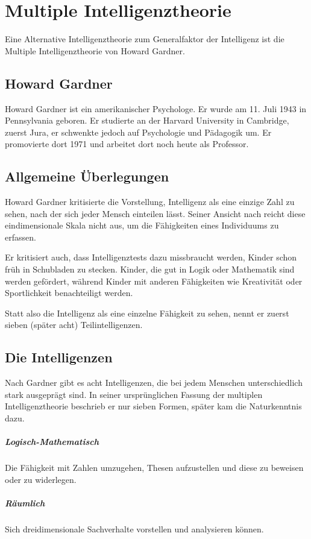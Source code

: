 \chapter{Multiple Intelligenztheorie}
Eine Alternative Intelligenztheorie zum Generalfaktor der Intelligenz ist die Multiple Intelligenztheorie von Howard Gardner.

\section{Howard Gardner}
Howard Gardner ist ein amerikanischer Psychologe. Er wurde am 11. Juli 1943 in Pennsylvania geboren. Er studierte an der Harvard University in Cambridge, zuerst Jura, er schwenkte jedoch auf Psychologie und Pädagogik um. Er promovierte dort 1971 und arbeitet dort noch heute als Professor.

\section{Allgemeine Überlegungen}
Howard Gardner kritisierte die Vorstellung, Intelligenz als eine einzige Zahl zu sehen, nach der sich jeder Mensch einteilen lässt. Seiner Ansicht nach reicht diese eindimensionale Skala nicht aus, um die Fähigkeiten eines Individuums zu erfassen.

Er kritisiert auch, dass Intelligenztests dazu missbraucht werden, Kinder schon früh in \glqq Schubladen zu stecken\grqq{}. Kinder, die gut in Logik oder Mathematik sind werden gefördert, während Kinder mit anderen Fähigkeiten wie Kreativität oder Sportlichkeit benachteiligt werden.

Statt also die Intelligenz als eine einzelne Fähigkeit zu sehen, nennt er zuerst sieben (später acht) Teilintelligenzen.

\section{Die Intelligenzen}
Nach Gardner gibt es acht Intelligenzen, die bei jedem Menschen unterschiedlich stark ausgeprägt sind. In seiner ursprünglichen Fassung der multiplen Intelligenztheorie beschrieb er nur sieben Formen, später kam die Naturkenntnis dazu.
\paragraph{Logisch-Mathematisch}
Die Fähigkeit mit Zahlen umzugehen, Thesen aufzustellen und diese zu beweisen oder zu widerlegen.
\paragraph{Räumlich}
Sich dreidimensionale Sachverhalte vorstellen und analysieren können.
